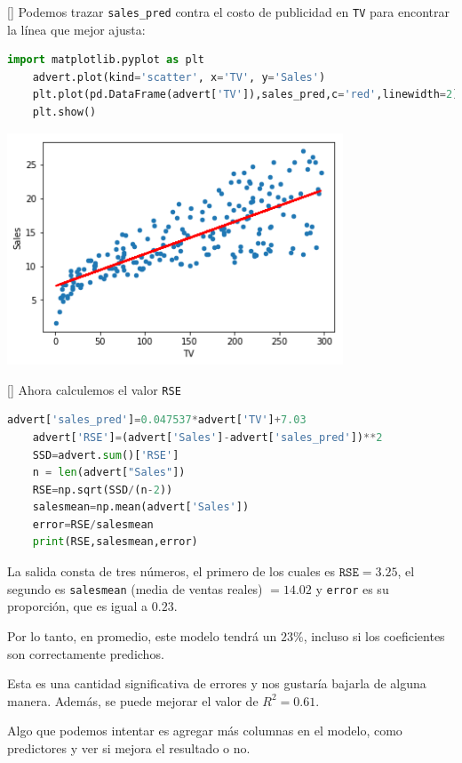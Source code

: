 []{}
Podemos trazar \texttt{sales\_pred} contra el costo de publicidad en \texttt{TV} para encontrar la línea que mejor ajusta:
\begin{lstlisting}[language=Python]
	import matplotlib.pyplot as plt
	advert.plot(kind='scatter', x='TV', y='Sales')
	plt.plot(pd.DataFrame(advert['TV']),sales_pred,c='red',linewidth=2)
	plt.show()
\end{lstlisting}



\begin{center}
	\includegraphics[width=10cm,keepaspectratio=true]{./images/statsModelExample.png}
\end{center}


[]
Ahora calculemos el valor \texttt{RSE}
\begin{lstlisting}[language=Python]
	advert['sales_pred']=0.047537*advert['TV']+7.03
	advert['RSE']=(advert['Sales']-advert['sales_pred'])**2
	SSD=advert.sum()['RSE']
	n = len(advert["Sales"])
	RSE=np.sqrt(SSD/(n-2))
	salesmean=np.mean(advert['Sales'])
	error=RSE/salesmean
	print(RSE,salesmean,error)
\end{lstlisting}


La salida consta de tres números, el primero de los cuales es $\texttt{RSE} = 3.25$, el segundo es
\texttt{salesmean} (media de ventas reales) $= 14.02$ y \texttt{error} es su proporción, que es igual
a $0.23$.




Por lo tanto, en promedio, este modelo tendrá un $23\%$, incluso si los coeficientes son
correctamente predichos.



Esta es una cantidad significativa de errores y nos gustaría bajarla de alguna manera. Además, se puede mejorar el valor de $R^{2}=0.61$.



Algo que
podemos intentar es agregar más columnas en el modelo, como predictores y ver si mejora el resultado o no.

